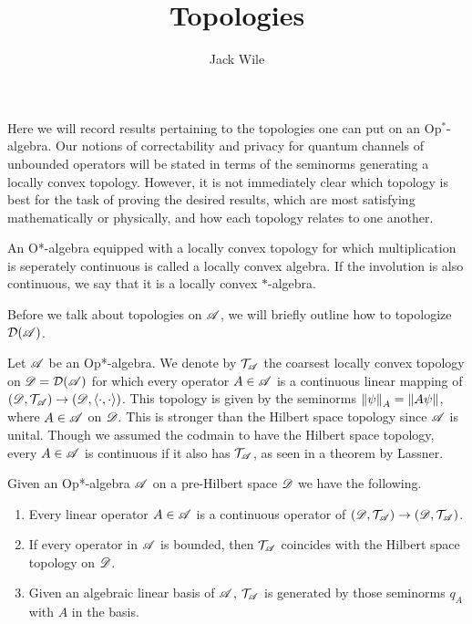 \documentclass[../main.tex]{subfiles}
\title{Topologies}
\author{Jack Wile}
\date{}
\begin{document}
Here we will record results pertaining to the topologies one can put on an Op$^*$-algebra. Our notions of correctability and privacy
for quantum channels of unbounded operators will be stated in terms of the seminorms generating a locally convex topology. However, it is 
not immediately clear which topology is best for the task of proving the desired results, which are most satisfying mathematically or physically,
and how each topology relates to one another.

\begin{definition}
	An O*-algebra equipped with a locally convex topology for which multiplication is seperately continuous is called
	a locally convex algebra. If the involution is also continuous, we say that it is a locally convex $\ast$-algebra.
\end{definition}

Before we talk about topologies on $\mathscr{A}$, we will briefly outline how to topologize $\mathcal{D}(\mathscr{A})$.

Let $\mathscr{A}$ be an Op*-algebra. We denote by $\mathcal{T}_\mathscr{A}$ the coarsest locally convex topology on $\mathscr{D} = \mathcal{D}(\mathscr{A})$
for which every operator $A \in \mathscr{A}$ is a continuous linear mapping of $(\mathscr{D}, \mathcal{T}_\mathscr{A}) \to (\mathscr{D}, \langle \cdot, \cdot \rangle)$.
This topology is given by the seminorms $\left\lVert\psi\right\rVert_A = \|A\psi\|$, where $A \in \mathscr{A}$ on $\mathscr{D}$. This is stronger than the Hilbert 
space topology since $\mathscr{A}$ is unital. Though we assumed the codmain to have the Hilbert space topology, every $A \in \mathscr{A}$ is 
continuous if it also has $\mathcal{T}_\mathscr{A}$, as seen in a theorem by Lassner.

\begin{theorem}

	Given an Op*-algebra $\mathscr{A}$ on a pre-Hilbert space $\mathscr{D}$ we have the following.
	
	\begin{enumerate}
	\item Every linear operator $A \in \mathscr{A}$ is a continuous operator of $(\mathscr{D}, \mathcal{T}_\mathscr{A}) \to (\mathscr{D}, \mathcal{T}_\mathscr{A})$.
	\item If every operator in $\mathscr{A}$ is bounded, then $\mathcal{T}_\mathscr{A}$ coincides with the Hilbert space topology on $\mathscr{D}$.
	\item Given an algebraic linear basis of $\mathscr{A}$, $\mathcal{T}_\mathscr{A}$ is generated by those seminorms $q_A$ with $A$ in the basis.

	\end{enumerate}

\end{theorem}
\end{document}
